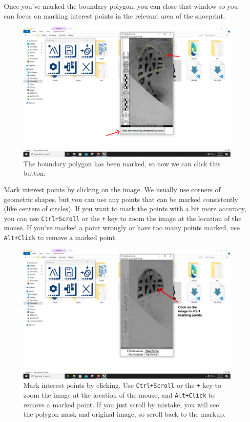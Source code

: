 \documentclass{csafedoc}
\begin{document}
Once you've marked the boundary polygon, you can close that window so you can focus on
marking interest points in the relevant area of the shoeprint.

\begin{figure}[H]
	\begin{center}
		\includegraphics[width=0.8\linewidth]{images/step_4c-anno.png}
	\end{center}
	\caption{The boundary polygon has been marked, so now we can click this button.}
	\label{fig:step4c}
\end{figure}

Mark interest points by clicking on the image. We usually use corners of geometric shapes,
but you can use any points that can be marked consistently (like centers of circles). If
you want to mark the points with a bit more accuracy, you can use \texttt{Ctrl+Scroll} or
the \texttt{+} key to zoom the image at the location of the mouse. If you've marked a
point wrongly or have too many points marked, use \texttt{Alt+Click} to remove a marked
point.

\begin{figure}[H]
	\begin{center}
		\includegraphics[width=0.8\linewidth]{images/step_4d-anno.png}
	\end{center}
	\caption{Mark interest points by clicking. Use \texttt{Ctrl+Scroll} or the \texttt{+} key
		to zoom the image at the location of the mouse, and \texttt{Alt+Click} to remove a marked
		point. If you just scroll by mistake, you will see the polygon mask and original image, so
		scroll back to the markup.}
	\label{fig:step4d}
\end{figure}
\end{document}
